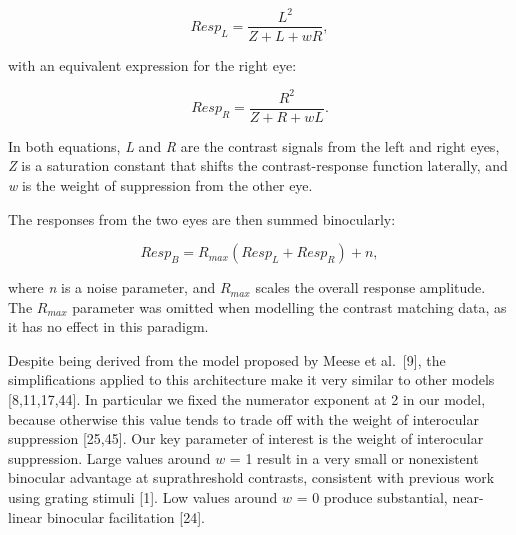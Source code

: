 \documentclass[
]{article}
\begin{document}
\begin{equation}
\label{eq:respL}
Resp_L = \frac{L^2}{Z + L + wR},
\end{equation}

with an equivalent expression for the right eye:

\begin{equation}
\label{eq:respR}
Resp_R = \frac{R^2}{Z + R + wL}.
\end{equation}

In both equations, \emph{L} and \emph{R} are the contrast signals from the left and right eyes, \emph{Z} is a saturation constant that shifts the contrast-response function laterally, and \emph{w} is the weight of suppression from the other eye.

The responses from the two eyes are then summed binocularly:

\begin{equation}
\label{eq:respB}
Resp_B = R_{max}(Resp_L + Resp_R) + n,
\end{equation}

where \emph{n} is a noise parameter, and \(R_{max}\) scales the overall response amplitude. The \(R_{max}\) parameter was omitted when modelling the contrast matching data, as it has no effect in this paradigm.

Despite being derived from the model proposed by Meese et al.~{[}9{]}, the simplifications applied to this architecture make it very similar to other models {[}8,11,17,44{]}. In particular we fixed the numerator exponent at 2 in our model, because otherwise this value tends to trade off with the weight of interocular suppression {[}25,45{]}. Our key parameter of interest is the weight of interocular suppression. Large values around \(w\) = 1 result in a very small or nonexistent binocular advantage at suprathreshold contrasts, consistent with previous work using grating stimuli {[}1{]}. Low values around \(w\) = 0 produce substantial, near-linear binocular facilitation {[}24{]}.
\end{document}
